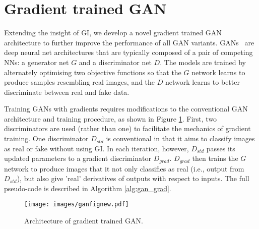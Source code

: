 \documentclass{article}
\begin{document}

\section{Gradient trained GAN}
\label{gan_grads}

Extending the insight of GI, we develop a novel gradient trained GAN architecture to further improve the performance of all GAN variants. GANs~\cite{goodfellow2014generative} are deep neural net architectures that are typically composed of a pair of competing NNs: a generator net $G$ and a discriminator net $D$. The models are trained by alternately optimising two objective functions so that the $G$ network learns to produce samples resembling real images, and the $D$ network learns to better discriminate between real and fake data.

Training GANs with gradients requires modifications to the conventional GAN architecture and training procedure, as shown in Figure \ref{gan_grad_arch}. First, two discriminators are used (rather than one) to facilitate the mechanics of gradient training. One discriminator $D_{std}$ is conventional in that it aims to classify images as real or fake without using GI. In each iteration, however, $D_{std}$ passes its updated parameters to a gradient discriminator $D_{grad}$. $D_{grad}$ then trains the $G$ network to produce images that it not only classifies as real (i.e., output from $D_{std}$), but also give 'real' derivatives of outputs with respect to inputs. The full pseudo-code is described in Algorithm \ref{alg:gan_grad}.

\begin{figure}[!ht]
\centering
\texttt{[image: images/ganfignew.pdf]}
\caption{Architecture of gradient trained GAN.}
\label{gan_grad_arch}
\end{figure}
\end{document}
